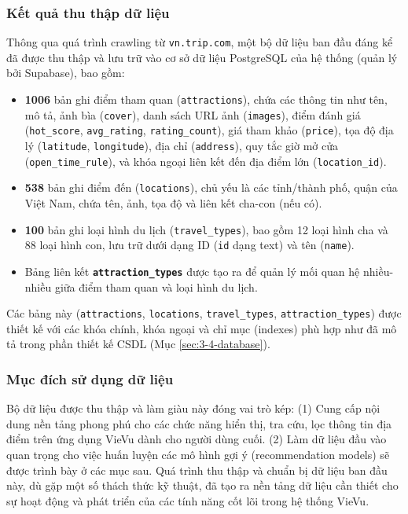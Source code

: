 \subsubsection{Kết quả thu thập dữ liệu}
Thông qua quá trình crawling từ \texttt{vn.trip.com}, một bộ dữ liệu ban đầu đáng kể đã được thu thập và lưu trữ vào cơ sở dữ liệu PostgreSQL của hệ thống (quản lý bởi Supabase), bao gồm:
\begin{itemize}
    \item \textbf{1006 } bản ghi điểm tham quan (\texttt{attractions}), chứa các thông tin như tên, mô tả, ảnh bìa (\texttt{cover}), danh sách URL ảnh (\texttt{images}), điểm đánh giá (\texttt{hot\_score}, \texttt{avg\_rating}, \texttt{rating\_count}), giá tham khảo (\texttt{price}), tọa độ địa lý (\texttt{latitude}, \texttt{longitude}), địa chỉ (\texttt{address}), quy tắc giờ mở cửa (\texttt{open\_time\_rule}), và khóa ngoại liên kết đến địa điểm lớn (\texttt{location\_id}).
    \item \textbf{538} bản ghi điểm đến (\texttt{locations}), chủ yếu là các tỉnh/thành phố, quận của Việt Nam, chứa tên, ảnh, tọa độ và liên kết cha-con (nếu có).
    \item \textbf{100} bản ghi loại hình du lịch (\texttt{travel\_types}), bao gồm 12 loại hình cha và 88 loại hình con, lưu trữ dưới dạng ID (\texttt{id} dạng text) và tên (\texttt{name}).
    \item Bảng liên kết \textbf{\texttt{attraction\_types}} được tạo ra để quản lý mối quan hệ nhiều-nhiều giữa điểm tham quan và loại hình du lịch.
\end{itemize}
Các bảng này (\texttt{attractions}, \texttt{locations}, \texttt{travel\_types}, \texttt{attraction\_types}) được thiết kế với các khóa chính, khóa ngoại và chỉ mục (indexes) phù hợp như đã mô tả trong phần thiết kế CSDL (Mục \ref{sec:3-4-database}).

\subsubsection{Mục đích sử dụng dữ liệu}
Bộ dữ liệu được thu thập và làm giàu này đóng vai trò kép: (1) Cung cấp nội dung nền tảng phong phú cho các chức năng hiển thị, tra cứu, lọc thông tin địa điểm trên ứng dụng VieVu dành cho người dùng cuối. (2) Làm dữ liệu đầu vào quan trọng cho việc huấn luyện các mô hình gợi ý (recommendation models) sẽ được trình bày ở các mục sau.
Quá trình thu thập và chuẩn bị dữ liệu ban đầu này, dù gặp một số thách thức kỹ thuật, đã tạo ra nền tảng dữ liệu cần thiết cho sự hoạt động và phát triển của các tính năng cốt lõi trong hệ thống VieVu.
